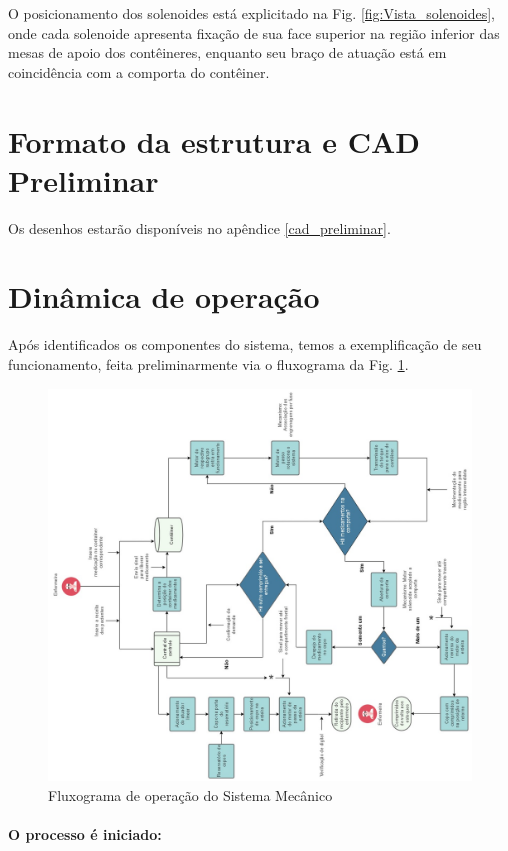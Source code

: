 O posicionamento dos solenoides está explicitado na Fig. \ref{fig:Vista_solenoides}, onde cada solenoide apresenta fixação de sua face superior na região inferior das mesas de apoio dos contêineres, enquanto seu braço de atuação está em coincidência com a comporta do contêiner.

\section{Formato da estrutura e CAD Preliminar}
Os desenhos estarão disponíveis no apêndice \ref{cad_preliminar}.

\section{Dinâmica de operação}

Após identificados os componentes do sistema, temos a exemplificação de seu funcionamento, feita preliminarmente via o fluxograma da Fig. \ref{fig:FEst}.

\begin{figure}[ht] %
        \centering
        \includegraphics[width=1\textwidth, angle = -90]{figuras/estrutura/FEstrV35.jpg}
        \caption{Fluxograma de operação do Sistema Mecânico}
        \label{fig:FEst}
    \end{figure}

\paragraph*{O processo é iniciado:}

